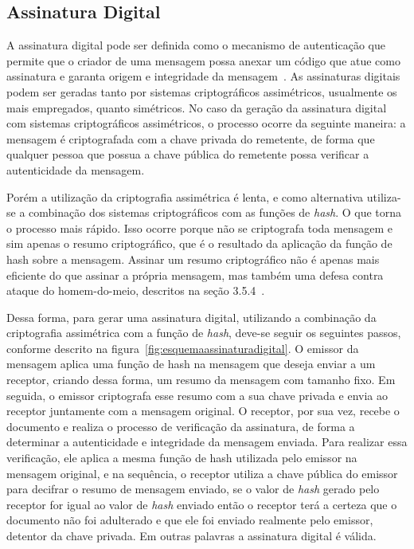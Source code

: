 \subsection{Assinatura Digital}

A assinatura digital pode ser definida como o mecanismo de autenticação que permite que o criador de uma mensagem possa anexar um código que atue como assinatura e garanta origem e integridade da mensagem~\cite{stallings2008}. As assinaturas digitais podem ser geradas tanto por sistemas criptográficos assimétricos, usualmente os mais empregados, quanto simétricos. No caso da geração da assinatura digital com sistemas criptográficos assimétricos, o processo ocorre da seguinte maneira: a mensagem é criptografada com a chave privada do remetente, de forma que qualquer pessoa que possua a chave pública do remetente possa verificar a autenticidade da mensagem.

Porém a utilização da criptografia assimétrica é lenta, e como alternativa utiliza-se a combinação dos sistemas criptográficos com as funções de \emph{hash}. O que torna o processo mais rápido. Isso ocorre porque não se criptografa toda mensagem e sim apenas o resumo criptográfico, que é o resultado da aplicação da função de hash sobre a mensagem. Assinar um resumo criptográfico não é apenas mais eficiente do que assinar a própria mensagem, mas também uma defesa contra ataque do homem-do-meio, descritos na seção 3.5.4~\cite{goodrich2013}.

Dessa forma, para gerar uma assinatura digital, utilizando a combinação da criptografia assimétrica com a função de \emph{hash}, deve-se seguir os seguintes passos, conforme descrito na figura~\ref{fig:esquemaassinaturadigital}. O emissor da mensagem aplica uma função de hash na mensagem que deseja enviar a um receptor, criando dessa forma, um resumo da mensagem com tamanho fixo. Em seguida, o emissor criptografa esse resumo com a sua chave privada e envia ao receptor juntamente com a mensagem original. O receptor, por sua vez, recebe o documento e realiza o processo de verificação da assinatura, de forma a determinar a autenticidade e integridade da mensagem enviada. Para realizar essa verificação, ele aplica a mesma função de hash utilizada pelo emissor na mensagem original, e na sequência, o receptor utiliza a chave pública do emissor para decifrar o resumo de mensagem enviado, se o valor de \emph{hash} gerado pelo receptor  for igual ao valor de \emph{hash} enviado então o receptor terá a certeza que o documento não foi adulterado e que ele foi enviado realmente pelo emissor, detentor da chave privada. Em outras palavras a assinatura digital é válida.

